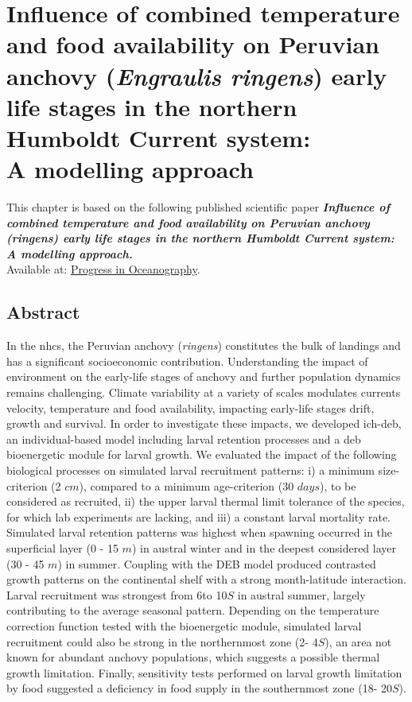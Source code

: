 \chapter{Influence of combined temperature and food availability on Peruvian anchovy (\textit{Engraulis ringens}) early life stages in the northern Humboldt Current system:\\A modelling approach}\label{Chap3}

\clearpage
This chapter is based on the following published scientific paper \citep{FlorLett2023} \textbf{\textit{Influence of combined temperature and food availability on Peruvian anchovy (\gls{ringens}) early life stages in the northern Humboldt Current system: A modelling approach.}}\\

Available at: \href{https://www.sciencedirect.com/science/article/abs/pii/S0079661123000770}{Progress in Oceanography}.

\clearpage
\section*{Abstract}

In the \acrfull{nhcs}, the Peruvian anchovy (\textit{\gls{ringens}}) constitutes the bulk of landings and has a significant socioeconomic contribution. Understanding the impact of environment on the early-life stages of anchovy and further population dynamics remains challenging. Climate variability at a variety of scales modulates currents velocity, temperature and food availability, impacting early-life stages drift, growth and survival. In order to investigate these impacts, we developed \gls{ich-deb}, an individual-based model including larval retention processes and a \acrfull{deb} bioenergetic module for larval growth. We evaluated the impact of the following biological processes on simulated larval recruitment patterns: i) a minimum size-criterion (2 $cm$), compared to a minimum age-criterion (30 $days$), to be considered as recruited, ii) the upper larval thermal limit tolerance of the species, for which lab experiments are lacking, and iii) a constant larval mortality rate. Simulated larval retention patterns was highest when spawning occurred in the superficial layer (0 - 15 $m$) in austral winter and in the deepest considered layer (30 - 45 $m$) in summer. Coupling with the DEB model produced contrasted growth patterns on the continental shelf with a strong month-latitude interaction. Larval recruitment was strongest from 6\textdegree  to 10\textdegree $S$ in austral summer, largely contributing to the average seasonal pattern. Depending on the temperature correction function tested with the bioenergetic module, simulated larval recruitment could also be strong in the northernmost zone (2\textdegree - 4\textdegree $S$), an area not known for abundant anchovy populations, which suggests a possible thermal growth limitation. Finally, sensitivity tests performed on larval growth limitation by food suggested a deficiency in food supply in the southernmost zone (18\textdegree - 20\textdegree $S$).\\

